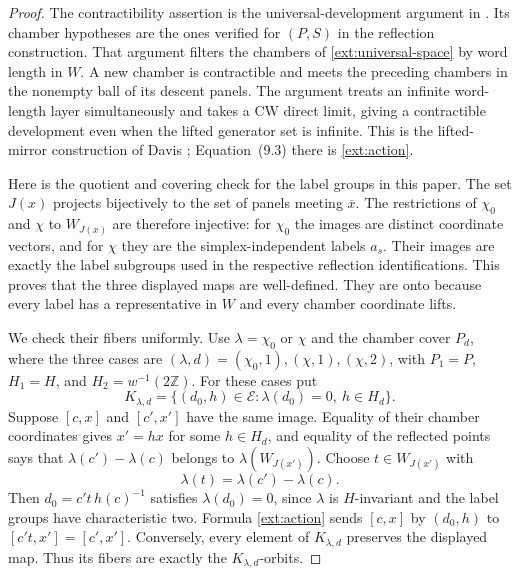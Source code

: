 \begin{proof}
The contractibility assertion is the universal-development
argument in \cite[Section~3, subsection \emph{The universal
development}, immediately before Proposition~3.2]{PD}.  Its
chamber hypotheses are the ones verified for $(P,S)$ in the
reflection construction.  That argument filters the chambers
of \eqref{ext:universal-space} by word length in $W$.  A new
chamber is contractible and meets the preceding chambers in
the nonempty ball of its descent panels.  The argument treats an
infinite word-length layer simultaneously and takes a CW direct
limit, giving a contractible development even when the lifted
generator set is infinite.  This is the lifted-mirror construction
of Davis \cite[Section~9.1, Equations~(9.1)--(9.3) and
Theorem~9.1.5]{Davis2008}; Equation~(9.3) there is
\eqref{ext:action}.

Here is the quotient and covering check for the label groups in
this paper.  The set $J(x)$ projects bijectively to the set of
panels meeting $\overline x$.  The restrictions of $\chi_0$ and
$\chi$ to $W_{J(x)}$ are therefore injective: for $\chi_0$ the
images are distinct coordinate vectors, and for $\chi$ they are
the simplex-independent labels $a_s$.  Their images are exactly
the label subgroups used in the respective reflection
identifications.  This proves that the three displayed maps are
well-defined.  They are onto because every label has a
representative in $W$ and every chamber coordinate lifts.

We check their fibers uniformly.  Use $\lambda=\chi_0$ or $\chi$
and the chamber cover $P_d$, where the three cases are
$(\lambda,d)=(\chi_0,1),(\chi,1),(\chi,2)$, with
$P_1=P$, $H_1=H$, and $H_2=w^{-1}(2\mathbb Z)$.
For these cases put
\[
 K_{\lambda,d}
   =\{(d_0,h)\in\mathcal E:\lambda(d_0)=0,\ h\in H_d\}.
\]
Suppose $[c,x]$ and $[c',x']$ have the same image.  Equality of
their chamber coordinates gives $x'=hx$ for some $h\in H_d$,
and equality of the reflected points says that
$\lambda(c')-\lambda(c)$ belongs to
$\lambda(W_{J(x')})$.  Choose $t\in W_{J(x')}$ with
\[
 \lambda(t)=\lambda(c')-\lambda(c).
\]
Then
$d_0=c't\,h(c)^{-1}$ satisfies $\lambda(d_0)=0$, since
$\lambda$ is $H$-invariant and the label groups have
characteristic two.  Formula \eqref{ext:action} sends $[c,x]$
by $(d_0,h)$ to $[c't,x']=[c',x']$.  Conversely, every element
of $K_{\lambda,d}$ preserves the displayed map.  Thus its
fibers are exactly the $K_{\lambda,d}$-orbits.


\end{proof}
